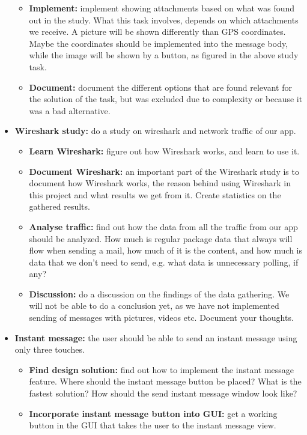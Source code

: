 \begin{itemize}
\begin{itemize}
\item{}\textbf{Implement:} implement showing attachments based on what was found out in the study. What this task involves, depends on which attachments we receive. A picture will be shown differently than GPS coordinates. Maybe the coordinates should be implemented into the message body, while the image will be shown by a button, as figured in the above study task.
\item{}\textbf{Document:} document the different options that are found relevant for the solution of the task, but was excluded due to complexity or because it was a bad alternative.
\end{itemize}
\item{}\textbf{Wireshark study:} do a study on wireshark and network traffic of our app.
\begin{itemize}
\item{}\textbf{Learn Wireshark:} figure out how Wireshark works, and learn to use it.
\item{}\textbf{Document Wireshark:} an important part of the Wireshark study is to document how Wireshark works, the reason behind using Wireshark in this project and what results we get from it. Create statistics on the gathered results.
\item{}\textbf{Analyse traffic:} find out how the data from all the traffic from our app should be analyzed. How much is regular package data that always will flow when sending a mail, how much of it is the content, and how much is data that we don’t need to send, e.g. what data is unnecessary polling, if any?
\item{}\textbf{Discussion:} do a discussion on the findings of the data gathering. We will not be able to do a conclusion yet, as we have not implemented sending of messages with pictures, videos etc. Document your thoughts.
\end{itemize}
\item{}\textbf{Instant message:} the user should be able to send an instant message using only three touches.
\begin{itemize}
\item{}\textbf{Find design solution:} find out how to implement the instant message feature. Where should the instant message button be placed? What is the fastest solution? How should the send instant message window look like?
\item{}\textbf{Incorporate instant message button into GUI:} get a working button in the GUI that takes the user to the instant message view.

\end{itemize}
\end{itemize}
